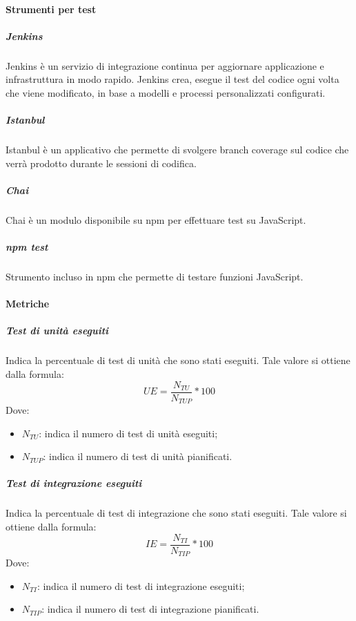 \documentclass[../NormeDiProgetto_v3.0.0.tex]{subfiles}
\begin{document}
		\paragraph{Strumenti per test}
            \subparagraph{Jenkins}
            Jenkins è un servizio di integrazione continua per aggiornare applicazione e infrastruttura in modo rapido. Jenkins crea, esegue il test del codice ogni volta che viene modificato, in base a modelli e processi personalizzati configurati.
            
            \subparagraph{Istanbul}
            Istanbul è un applicativo che permette di svolgere branch coverage sul codice che verrà prodotto durante le sessioni di codifica.
            
			\subparagraph{Chai}
			Chai è un modulo disponibile su npm per effettuare test su JavaScript.

			\subparagraph{npm test}
			Strumento incluso in npm che permette di testare funzioni JavaScript.

		\paragraph{Metriche}\mbox{}
			\subparagraph{Test di unità eseguiti}
			Indica la percentuale di test di unità che sono stati eseguiti.
			Tale valore si ottiene dalla formula:
			\begin{equation*}
				UE = \frac{N_{TU}}{N_{TUP}} * 100
			\end{equation*}
			Dove:
			\begin{itemize}
				\item \textbf{$N_{TU}$}: indica il numero di test di unità eseguiti;
				\item \textbf{$N_{TUP}$}: indica il numero di test di unità pianificati.
			\end{itemize}
			
			\subparagraph{Test di integrazione eseguiti}
			Indica la percentuale di test di integrazione che sono stati eseguiti.
			Tale valore si ottiene dalla formula:
			\begin{equation*}
				IE = \frac{N_{TI}}{N_{TIP}} * 100
			\end{equation*}
			Dove:
			\begin{itemize}
				\item \textbf{$N_{TI}$}: indica il numero di test di integrazione eseguiti;
				\item \textbf{$N_{TIP}$}: indica il numero di test di integrazione pianificati.
			\end{itemize}
			
\end{document}
